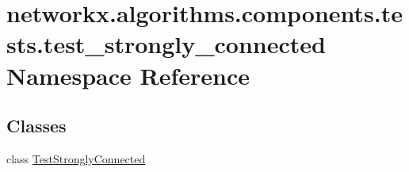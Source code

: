 \hypertarget{namespacenetworkx_1_1algorithms_1_1components_1_1tests_1_1test__strongly__connected}{}\section{networkx.\+algorithms.\+components.\+tests.\+test\+\_\+strongly\+\_\+connected Namespace Reference}
\label{namespacenetworkx_1_1algorithms_1_1components_1_1tests_1_1test__strongly__connected}
\subsection*{Classes}
\begin{DoxyCompactItemize}
\item 
class \hyperlink{classnetworkx_1_1algorithms_1_1components_1_1tests_1_1test__strongly__connected_1_1TestStronglyConnected}{Test\+Strongly\+Connected}
\end{DoxyCompactItemize}

